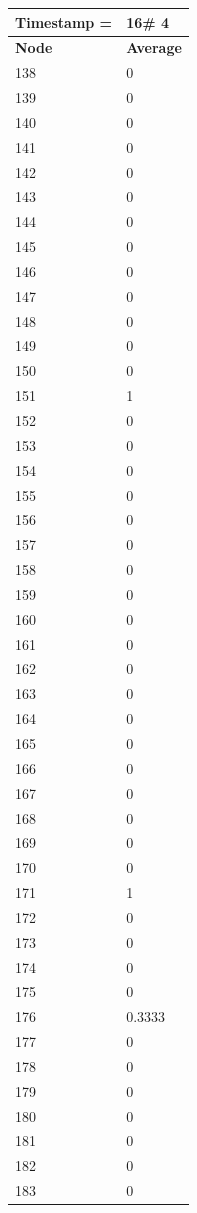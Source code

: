 \begin{tabular}{|l||l|}
\hline
\textbf{Timestamp =} & \textbf{16}\# 4\\\hline
	\textbf{Node} & \textbf{Average} \\ \hline
\hline
	138 & 0 \\ \hline
	139 & 0 \\ \hline
	140 & 0 \\ \hline
	141 & 0 \\ \hline
	142 & 0 \\ \hline
	143 & 0 \\ \hline
	144 & 0 \\ \hline
	145 & 0 \\ \hline
	146 & 0 \\ \hline
	147 & 0 \\ \hline
	148 & 0 \\ \hline
	149 & 0 \\ \hline
	150 & 0 \\ \hline
	151 & 1 \\ \hline
	152 & 0 \\ \hline
	153 & 0 \\ \hline
	154 & 0 \\ \hline
	155 & 0 \\ \hline
	156 & 0 \\ \hline
	157 & 0 \\ \hline
	158 & 0 \\ \hline
	159 & 0 \\ \hline
	160 & 0 \\ \hline
	161 & 0 \\ \hline
	162 & 0 \\ \hline
	163 & 0 \\ \hline
	164 & 0 \\ \hline
	165 & 0 \\ \hline
	166 & 0 \\ \hline
	167 & 0 \\ \hline
	168 & 0 \\ \hline
	169 & 0 \\ \hline
	170 & 0 \\ \hline
	171 & 1 \\ \hline
	172 & 0 \\ \hline
	173 & 0 \\ \hline
	174 & 0 \\ \hline
	175 & 0 \\ \hline
	176 & 0.3333 \\ \hline
	177 & 0 \\ \hline
	178 & 0 \\ \hline
	179 & 0 \\ \hline
	180 & 0 \\ \hline
	181 & 0 \\ \hline
	182 & 0 \\ \hline
	183 & 0 \\ \hline
\end{tabular}
